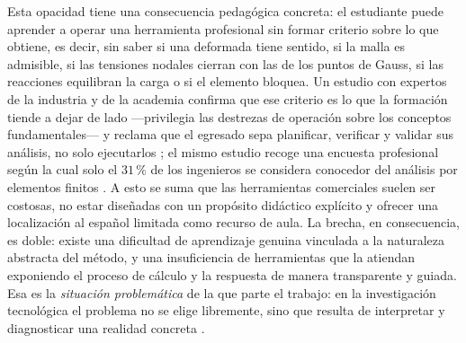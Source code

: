 Esta opacidad tiene una consecuencia pedagógica concreta: el estudiante puede aprender a operar una herramienta profesional sin formar criterio sobre lo que obtiene, es decir, sin saber si una deformada tiene sentido, si la malla es admisible, si las tensiones nodales cierran con las de los puntos de Gauss, si las reacciones equilibran la carga o si el elemento bloquea. Un estudio con expertos de la industria y de la academia confirma que ese criterio es lo que la formación tiende a dejar de lado —privilegia las destrezas de operación sobre los conceptos fundamentales— y reclama que el egresado sepa planificar, verificar y validar sus análisis, no solo ejecutarlos \autocites[p.~1159]{perezsantiago2023fem}[p.~1171]{perezsantiago2023fem}; el mismo estudio recoge una encuesta profesional según la cual solo el $31\,\%$ de los ingenieros se considera conocedor del análisis por elementos finitos \autocite[p.~1160]{perezsantiago2023fem}. A esto se suma que las herramientas comerciales suelen ser costosas, no estar diseñadas con un propósito didáctico explícito \autocite[p.~1160]{perezsantiago2023fem} y ofrecer una localización al español limitada como recurso de aula. La brecha, en consecuencia, es doble: existe una dificultad de aprendizaje genuina vinculada a la naturaleza abstracta del método, y una insuficiencia de herramientas que la atiendan exponiendo el proceso de cálculo y la respuesta de manera transparente y guiada. Esa es la \emph{situación problemática} de la que parte el trabajo: en la investigación tecnológica el problema no se elige libremente, sino que resulta de interpretar y diagnosticar una realidad concreta \autocite[p.~83]{garciacordoba2005tecnologica}.

